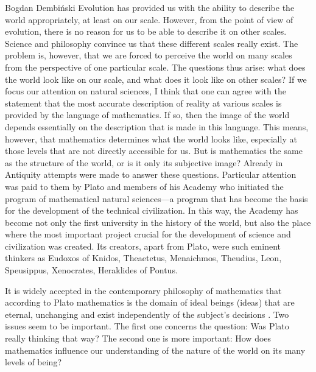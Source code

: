 \begin{artengenv}{Bogdan Dembiński}
\lettrine[loversize=0.13,lines=2,lraise=-0.05,nindent=0em,findent=0.2pt]%
{E}{}volution has provided us with the ability to describe the world appropriately, at least on %
 our scale. However, from the point of view of evolution, there is no reason for us to be able to describe it on other
scales. Science and philosophy convince us that these different scales really exist. The problem is, however, that we
are forced to perceive the world on many scales from the perspective of one particular scale. The questions thus arise:
what does the world look like  on our scale, and what does it look like on other scales? If we focus our attention on
natural sciences, I think that one can agree with the statement that the most accurate description of reality at
various scales is provided by the language of mathematics. If so, then the image of the world depends essentially on
the description that is made in this language. This means, however, that mathematics determines what the world looks
like, especially at those levels that are not directly accessible for us. But is mathematics the same as the structure
of the world, or is it only its subjective image? Already in Antiquity attempts were made to answer
these questions. Particular attention was paid to them by Plato and members of his Academy who initiated the program of
mathematical natural sciences---a program that has become the basis for the development of the technical civilization.
In this way, the Academy has become not only the first university in the history of the world, but also the place where
the most important project crucial for the development of science and civilization was created. Its creators, apart from
Plato, were such eminent thinkers as Eudoxos of Knidos, Theaetetus, Menaichmos, Theudius, %
Leon, Speusippus, Xenocrates, Heraklides of Pontus. 

It is widely accepted in the contemporary philosophy of mathematics that according to Plato mathematics is the domain
of ideal beings (ideas) that are eternal, unchanging and exist independently of the subject's decisions
\parencite[pp.12–16]{brown_philosophy_2008}.
Two issues seem to be important. The first
one concerns the question: Was Plato really thinking that way? The second one is more important: How does mathematics
influence our understanding of the nature of the world on its many levels of being?


\end{artengenv}
